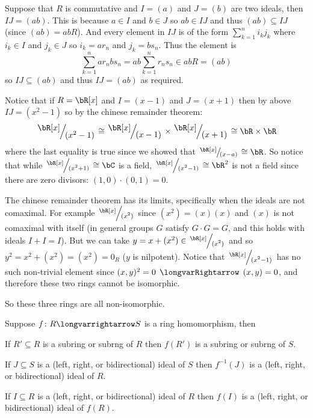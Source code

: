 \documentclass[10pt]{article}
\def\implies{\,\mathrel{\longvarRightarrow}\,}
\let\longto=\longvarrightarrow
\begin{document}


\bigskip

\begin{exam*}

    Suppose that $R$ is commutative and $I=(a)$ and $J=(b)$ are two ideals, then $IJ=(ab)$.
    This is because $a\in I$ and $b\in J$ so $ab\in IJ$ and thus $(ab)\subseteq IJ$ (since $(ab)=abR$).
    And every element in $IJ$ is of the form $\sum_{k=1}^n i_kj_k$ where $i_k\in I$ and $j_k\in J$ so $i_k=ar_n$ and $j_k=bs_n$.
    Thus the element is
    \[ \sum_{k=1}^n ar_nbs_n = ab\sum_{k=1}^n r_ns_n \in abR = (ab) \]
    so $IJ\subseteq(ab)$ and thus $IJ=(ab)$ as required.

\end{exam*}

Notice that if $R=\bR[x]$ and $I=(x-1)$ and $J=(x+1)$ then by above $IJ=(x^2-1)$ so by the chinese remainder theorem:
\[ \slfrac{\bR[x]}{(x^2-1)} \cong \slfrac{\bR[x]}{(x-1)} \times \slfrac{\bR[x]}{(x+1)} \cong \bR\times\bR \]
where the last equality is true since we showed that $\slfrac{\bR[x]}{(x-a)}\cong\bR$.
So notice that while $\slfrac{\bR[x]}{(x^2+1)}\cong\bC$ is a field, $\slfrac{\bR[x]}{(x^2-1)}\cong\bR^2$ is not a field since there are zero divisors: $(1,0)\cdot(0,1)=0$.

The chinese remainder theorem has its limits, specifically when the ideals are not comaximal.
For example $\slfrac{\bR[x]}{(x^2)}$ since $(x^2)=(x)(x)$ and $(x)$ is not comaximal with itself (in general groups $G$ satisfy $G\cdot G=G$, and this holds with ideals $I+I=I$).
But we can take $y=x+(x^2)\in\slfrac{\bR[x]}{(x^2)}$ and so $y^2=x^2+(x^2)=(x^2)=0_R$ ($y$ is nilpotent).
Notice that $\slfrac{\bR[x]}{(x^2-1)}$ has no such non-trivial element since $(x,y)^2=0\implies(x,y)=0$, and therefore these two rings cannot be isomorphic.

So these three rings are all non-isomorphic.

\begin{prop*}

    Suppose $f\colon R\longto S$ is a ring homomorphism, then
    \benum
        \item If $R'\subseteq R$ is a subring or subrng of $R$ then $f(R')$ is a subring or subrng of $S$.
        \item If $J\subseteq S$ is a (left, right, or bidirectional) ideal of $S$ then $f^{-1}(J)$ is a (left, right, or bidirectional) ideal of $R$.
        \item If $I\subseteq R$ is a (left, right, or bidirectional) ideal of $R$ then $f(I)$ is a (left, right, or bidirectional) ideal of $f(R)$.
    \eenum

\end{prop*}
\end{document}
